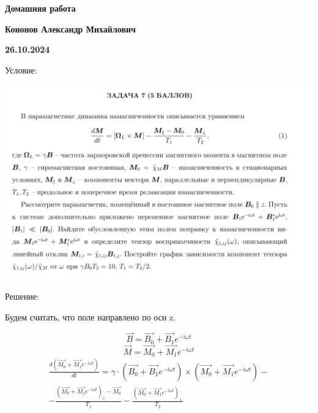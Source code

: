 \documentclass[12pt]{article}
\begin{document}
\begin{large}
\begin{center}
\LARGE \textbf{Домашняя работа}
\par
\LARGE \textbf{Кононов Александр Михайлович}
\par
    \textbf{26.10.2024}
\end{center}
\par Условие:
\par
\includegraphics[width=1\textwidth]{photo.png}
\par Решение:
\par Будем считать, что поле направлено по оси z.
\par
\par
\[
    \overrightarrow{B} = \overrightarrow{B_0} + \overrightarrow{B_1} e^{-i\omega t}
\]
\[
    \overrightarrow{M} = \overrightarrow{M_0} + \overrightarrow{M_1} e^{-i\omega t}
\]
\begin{eqnarray*}
    \frac{d\left(  \overrightarrow{M_0} + \overrightarrow{M_1} e^{-i\omega t}\right)}{dt} = \gamma \cdot \left( \overrightarrow{B_0} + \overrightarrow{B_1} e^{-i\omega t} \right) \times \left( \overrightarrow{M_0} + \overrightarrow{M_1} e^{-i\omega t} \right) - \\
    - \frac{\left( \overrightarrow{M_0} + \overrightarrow{M_1} e^{-i\omega t} \right)_{||} - \overrightarrow{M_0}}{T_1} - \frac{\left( \overrightarrow{M_0} + \overrightarrow{M_1} e^{-i\omega t} \right)_{\perp}}{T_2}
\end{eqnarray*}

\end{large}
\end{document}
